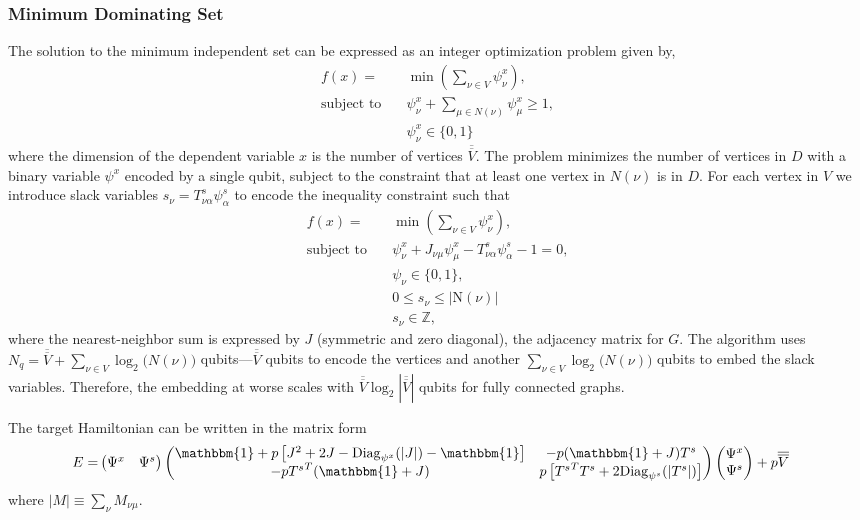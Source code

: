 \documentclass[fleqn,10pt]{wlscirep}
\begin{document}
\subsubsection{Minimum Dominating Set}
The solution to the minimum independent set can be expressed as an integer optimization problem given by,
\begin{align}
f(x) = &\min(\sum_{\nu \in V} \psi^x_{\nu}),\\
\textrm{subject to} \quad & \psi^x_{\nu} + \sum_{\mu \in \mathit{N}(\nu)} \psi^x_{\mu} \geq 1,\\
& \psi^x_{\nu} \in \{0, 1\}
\end{align}
where the dimension of the dependent variable $x$ is the number of vertices $\overline{\overline{V}}$.
The problem minimizes the number of vertices in $D$ with a binary variable $\psi^x$ encoded by a single qubit, subject to the constraint that at least one vertex in $\mathit{N}(\nu)$ is in $D$. For each vertex in $V$ we introduce slack variables $s_{\nu} = T^s_{\nu \alpha} \psi^s_{\alpha}$ to encode the inequality constraint such that
\begin{align}
f(x) = &\min(\sum_{\nu\in V} \psi^x_{\nu}),\\
\textrm{subject to} \quad & \psi^x_{\nu} + J_{\nu \mu} \psi^x_{\mu}- T^s_{\nu \alpha} \psi^s_{\alpha}  - 1 = 0,\\
& \psi_{\nu} \in \{0, 1\},\\
& 0 \leq s_{\nu} \leq |\mathrm{N}(\nu)|\\
& s_{\nu} \in \mathbb{Z},
\end{align}
where the nearest-neighbor sum is expressed by $J$ (symmetric and zero diagonal), the adjacency matrix for $G$.
The algorithm uses $N_q = \overline{\overline{V}} + \sum_{\nu \in V} \log_2 \mathit(N(\nu))$ qubits---$\overline{\overline{V}}$ qubits to encode the vertices and another $\sum_{\nu \in V} \log_2 \mathit(N(\nu))$ qubits to embed the slack variables. Therefore, the embedding at worse scales with $\overline{\overline{V}} \log_2 |\overline{\overline{V}}|$ qubits for fully connected graphs.

The target Hamiltonian can be written in the matrix form
\begin{align}
E = &
\begin{pmatrix}
\Psi^x & \Psi^s
\end{pmatrix}
\begin{pmatrix}
\mathbbm{1} + p\left[J^2 + 2 J - \mathrm{Diag}_{\psi^x}(|J|) - \mathbbm{1} \right] & - p(\mathbbm{1}+J)T^s\\
- p{T^s}^T(\mathbbm{1}+J)& p\left[{T^s}^T T^s + 2\mathrm{Diag}_{\psi^s}(|T^s|)\right]
\end{pmatrix}
\begin{pmatrix}
\Psi^x\\ \Psi^s
\end{pmatrix} + p \overline{\overline{V}}
\label{eq:matrix_form}
\end{align}
where $ |M| \equiv \sum_{\nu} M_{\nu \mu}$.
\end{document}
